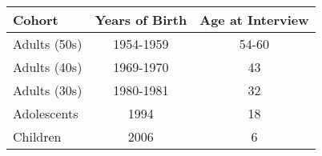 \begin{tabular}{lcc}
\toprule
Cohort 			& Years of Birth 	& Age at Interview \\ \midrule
Adults (50s)	  	& 1954-1959 		& 54-60 \\
Adults (40s)	   	& 1969-1970		& 43	\\
Adults (30s)    		& 1980-1981		& 32    \\
Adolescents 	   	& 1994			& 18 	\\
Children 	   		& 2006			& 6 \\ 
\bottomrule 
\end{tabular}